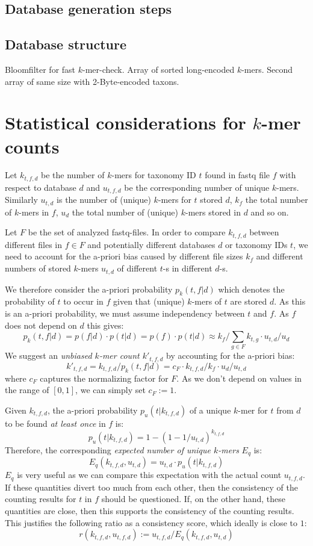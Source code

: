 \documentclass[
	a4paper, %
	10pt, %
	unnumberedsections, %
	twoside, %
]{LTJournalArticle}
\begin{document}
\subsection{Database generation steps}
\subsection{Database structure}
Bloomfilter for fast $k$-mer-check.
Array of sorted long-encoded $k$-mers.
Second array of same size with 2-Byte-encoded taxons.

\section{Statistical considerations for $k$-mer counts}\label{discussion}

Let $k_{t,f,d}$ be the number of $k$-mers for taxonomy ID $t$ found in fastq file $f$ with respect to database $d$ and $u_{t,f,d}$ be the corresponding number of unique $k$-mers. Similarly $u_{t,d}$ is the number of (unique) $k$-mers for $t$ stored $d$, $k_f$ the total number of $k$-mers in $f$, $u_d$ the total number of (unique) $k$-mers stored in $d$ and so on.

Let $F$ be the set of analyzed fastq-files.
In order to compare $k_{t,f,d}$ between different files in $f \in F$ and potentially different databases $d$ or taxonomy IDs $t$, we need to account for the a-priori bias caused by different file sizes $k_f$ and different numbers of stored $k$-mers $u_{t,d}$ of different $t$-s in different $d$-s.

We therefore consider the a-priori probability $p_k(t,f | d)$ which denotes the probability of $t$ to occur in $f$ given that (unique) $k$-mers of $t$ are stored $d$. As this is an a-priori probability, we must assume independency between $t$ and $f$. As $f$ does not depend on $d$ this gives:
\[ p_k(t,f | d) = p(f | d) \cdot p(t | d) = p(f) \cdot p(t | d) \approx k_{f} / \sum_{g \in F} k_{t,g} \cdot u_{t,d} / u_d\] 
We suggest an \emph{unbiased $k$-mer count $k'_{t,f,d}$} by accounting for the a-priori bias:
\[ k'_{t,f,d} = k_{t,f,d} / p_k(t,f | d) = c_{F} \cdot k_{t,f,d} /  k_{f} \cdot  u_d / u_{t,d} \]
where $c_{F}$ captures the normalizing factor for $F$. As we don't depend on values in the range of $[0,1]$, we can simply set $c_{F} := 1$.

Given $k_{t,f,d}$, the a-priori probability $p_u(t |k_{t,f,d})$ of a unique $k$-mer for $t$ from $d$ to be found \emph{at least once} in $f$ is:
\[ p_u(t |k_{t,f,d}) = 1 - (1 - 1/u_{t,d})^{k_{t,f,d}}\]
Therefore, the corresponding \emph{expected number of unique $k$-mers} $E_q$ is:
\[ E_q(k_{t,f,d},u_{t,d}) = u_{t,d} \cdot p_u(t |k_{t,f,d})\]
$E_q$ is very useful as we can compare this expectation with the actual count $u_{t,f,d}$. If these quantities divert too much from each other, then the consistency of the counting results for $t$ in $f$ should be questioned. If, on the other hand, these quantities are close, then this supports the consistency of the counting results. This justifies the following ratio as a consistency score, which ideally is close to $1$:
\[ r(k_{t,f,d}, u_{t,f,d}) := u_{t,f,d} / E_q(k_{t,f,d},u_{t,d})\]
\end{document}

